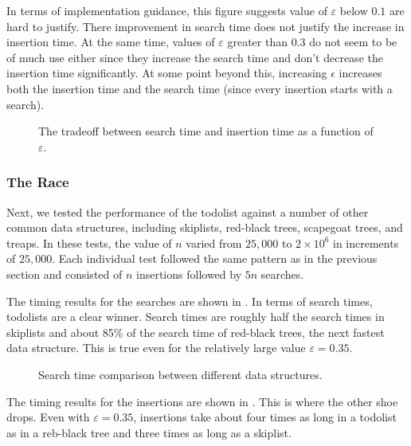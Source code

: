 \documentclass[lotsofwhite]{patmorin}
\newcommand{\eps}{\varepsilon}
\begin{document}
In terms of implementation guidance, this figure suggests value of
$\eps$ below $0.1$ are hard to justify.  There improvement in search
time does not justify the increase in insertion time.  At the same time,
values of $\eps$ greater than $0.3$ do not seem to be of much use either
since they increase the search time and don't decrease the insertion
time significantly. At some point beyond this, increasing $\epsilon$
increases both the insertion time and the search time (since every
insertion starts with a search).

\begin{figure}
  \centering{}
  \caption{The tradeoff between search time and insertion time as a function of $\eps$.}
\end{figure}

\subsubsection{The Race}

Next, we tested the performance of the todolist against a number of
other common data structures, including skiplists, red-black trees,
scapegoat trees, and treaps. In these tests, the value of $n$ varied from
$25,000$ to $2\times 10^6$ in increments of $25,000$.   Each individual
test followed the same pattern as in the previous section and consisted
of $n$ insertions followed by $5n$ searches.

The timing results for the searches are shown in . In
terms of search times, todolists are a clear winner.  Search times are
roughly half the search times in skiplists and about 85\% of the search
time of red-black trees, the next fastest data structure.  This is true
even for the relatively large value $\eps=0.35$.

\begin{figure}
  \centering{}
  \caption{Search time comparison between different data structures.}
\end{figure}

The timing results for the insertions are shown in
. This is where the other shoe drops.  Even with
$\eps=0.35$, insertions take about four times as long in a todolist as
in a reb-black tree and three times as long as a skiplist.
\end{document}
